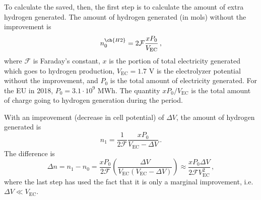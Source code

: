 To calculate the  saved, then, the first step is to calculate the amount of extra hydrogen generated. The amount of hydrogen generated (in mols) without the improvement is
\begin{equation}
n^{\ch{H2}}_0 = 2\mathcal{F} \frac{xP_0}{V_\text{EC}}\,,
\end{equation}
where $\mathcal{F}$ is Faraday's constant, $x$ is the portion of total electricity generated which goes to hydrogen production, $V_\text{EC}=1.7$ V is the electrolyzer potential without the improvement, and $P_0$ is the total amount of electricity generated. For the EU in 2018, $P_0=3.1\cdot10^9$ MWh. The quantity $xP_0/V_\text{EC}$ is the total amount of charge going to hydrogen generation during the period.

With an improvement (decrease in cell potential) of $\Delta V$, the amount of hydrogen generated is
\begin{equation}
n_1 = \frac{1}{2\mathcal{F}} \frac{xP_0}{V_\text{EC}-\Delta V}\,.
\end{equation}
The difference is
\begin{equation}
\Delta n = n_1 - n_0 = \frac{xP_0}{2\mathcal{F}}\left(\frac{\Delta V}{V_\text{EC}(V_\text{EC}-\Delta  V)}\right) \approx \frac{xP_0\Delta V}{2\mathcal{F} V_\text{EC}^2}\,,
\end{equation}
where the last step has used the fact that it is only a marginal improvement, i.e. $\Delta V \ll V_\text{EC}$.


